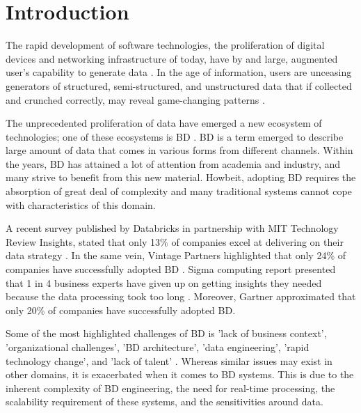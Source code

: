 \documentclass{ieeeaccess}
\begin{document}
\titlepgskip=-15pt

\maketitle

\section{Introduction}

The rapid development of software technologies, the proliferation of digital devices and networking infrastructure of today, have by and large, augmented user’s capability to generate data \cite{AtaeiSecurity}. In the age of information, users are unceasing generators of structured, semi-structured, and unstructured data that if collected and crunched correctly, may reveal game-changing patterns \cite{AtaeiACIS}.

The unprecedented proliferation of data have emerged a new ecosystem of technologies; one of these ecosystems is BD \cite{AtaeiHype}. BD is a term emerged to describe large amount of data that comes in various forms from different channels. Within the years, BD has attained a lot of attention from academia and industry, and many strive to benefit from this new material. Howbeit, adopting BD requires the absorption of great deal of complexity and many traditional systems cannot cope with characteristics of this domain. 

A recent survey published by Databricks in partnership with MIT Technology Review Insights, stated that only 13\% of companies excel at delivering on their data strategy \cite{DataBricksSurvey}. In the same vein, Vintage Partners highlighted that only 24\% of companies have successfully adopted BD \cite{NewVantageSurvey}. Sigma computing report presented that 1 in 4 business experts have given up on getting insights they needed because the data processing took too long \cite{SigmaSurvey}. Moreover, Gartner approximated that only 20\% of companies have successfully adopted BD. 

Some of the most highlighted challenges of BD is 'lack of business context', 'organizational challenges', 'BD architecture', 'data engineering', 'rapid technology change', and 'lack of talent' \cite{AtaeiBigDataEnvirons}. Whereas similar issues may exist in other domains, it is exacerbated when it comes to BD systems. This is due to the inherent complexity of BD engineering, the need for real-time processing, the scalability requirement of these systems, and the sensitivities around data.
\end{document}
